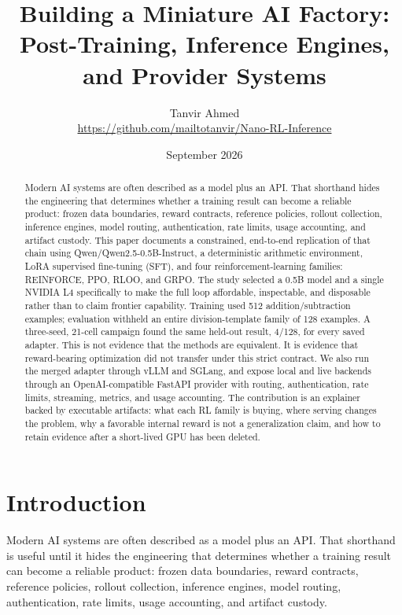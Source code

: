 \documentclass[10pt]{article}
\title{Building a Miniature AI Factory:\\ \large Post-Training, Inference Engines, and Provider Systems}
\author{Tanvir Ahmed\\\small \url{https://github.com/mailtotanvir/Nano-RL-Inference}}
\date{September 2026}
\begin{document}
\sloppy\maketitle

\begin{abstract}
Modern AI systems are often described as a model plus an API. That shorthand hides the engineering that determines whether a training result can become a reliable product: frozen data boundaries, reward contracts, reference policies, rollout collection, inference engines, model routing, authentication, rate limits, usage accounting, and artifact custody. This paper documents a constrained, end-to-end replication of that chain using Qwen/Qwen2.5-0.5B-Instruct, a deterministic arithmetic environment, LoRA supervised fine-tuning (SFT), and four reinforcement-learning families: REINFORCE, PPO, RLOO, and GRPO. The study selected a 0.5B model and a single NVIDIA L4 specifically to make the full loop affordable, inspectable, and disposable rather than to claim frontier capability. Training used 512 addition/subtraction examples; evaluation withheld an entire division-template family of 128 examples. A three-seed, 21-cell campaign found the same held-out result, 4/128, for every saved adapter. This is not evidence that the methods are equivalent. It is evidence that reward-bearing optimization did not transfer under this strict contract. We also run the merged adapter through vLLM and SGLang, and expose local and live backends through an OpenAI-compatible FastAPI provider with routing, authentication, rate limits, streaming, metrics, and usage accounting. The contribution is an explainer backed by executable artifacts: what each RL family is buying, where serving changes the problem, why a favorable internal reward is not a generalization claim, and how to retain evidence after a short-lived GPU has been deleted.
\end{abstract}

\section{Introduction}
Modern AI systems are often described as a model plus an API. That shorthand is useful until it hides the engineering that determines whether a training result can become a reliable product: frozen data boundaries, reward contracts, reference policies, rollout collection, inference engines, model routing, authentication, rate limits, usage accounting, and artifact custody.
\end{document}
